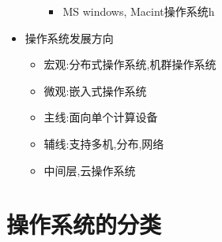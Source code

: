 \documentclass[a4paper,10pt,notitlepage]{article}
\begin{document}
\begin{itemize}
\begin{itemize}
\begin{itemize}
			\item MS windows, Macint操作系统h
		\end{itemize}
	\end{itemize}
	\item 操作系统发展方向
		\begin{itemize}
			\item 宏观:分布式操作系统,机群操作系统
			\item 微观:嵌入式操作系统
			\item 主线:面向单个计算设备
			\item 辅线:支持多机,分布,网络
			\item 中间层,云操作系统
		\end{itemize}
\end{itemize}

\section{操作系统的分类}
\end{document}
